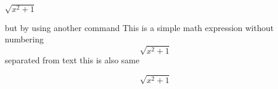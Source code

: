 \documentclass{article}
\begin{document}
	
	\begin{math}
		\sqrt{x^2+1}	
	\end{math}
	
	but by using another command
	This is a simple math expression without numbering
	\[\sqrt{x^2+1}\]
	separated from text
	this is also same
	
	\begin{displaymath}
		\sqrt{x^2+1}
	\end{displaymath}
\end{document}

